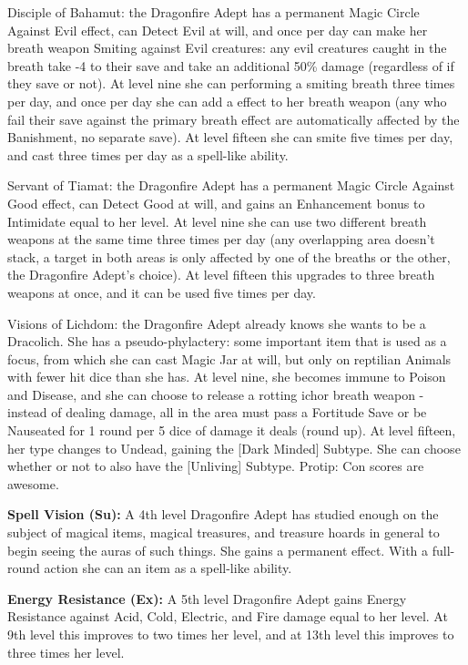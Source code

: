 \begin{description*}
\item[Disciple of Bahamut:] the Dragonfire Adept has a permanent Magic Circle Against Evil effect, can Detect Evil at will, and once per day can make her breath weapon Smiting against Evil creatures: any evil creatures caught in the breath take -4 to their save and take an additional 50\% damage (regardless of if they save or not). At level nine she can performing a smiting breath three times per day, and once per day she can add a  effect to her breath weapon (any who fail their save against the primary breath effect are automatically affected by the Banishment, no separate save). At level fifteen she can smite five times per day, and cast  three times per day as a spell-like ability.
\item[Servant of Tiamat:] the Dragonfire Adept has a permanent Magic Circle Against Good effect, can Detect Good at will, and gains an Enhancement bonus to Intimidate equal to her level. At level nine she can use two different breath weapons at the same time three times per day (any overlapping area doesn't stack, a target in both areas is only affected by one of the breaths or the other, the Dragonfire Adept's choice). At level fifteen this upgrades to three breath weapons at once, and it can be used five times per day.
\item[Visions of Lichdom:] the Dragonfire Adept already knows she wants to be a Dracolich. She has a pseudo-phylactery: some important item that is used as a focus, from which she can cast Magic Jar at will, but only on reptilian Animals with fewer hit dice than she has. At level nine, she becomes immune to Poison and Disease, and she can choose to release a rotting ichor breath weapon - instead of dealing damage, all in the area must pass a Fortitude Save or be Nauseated for 1 round per 5 dice of damage it deals (round up). At level fifteen, her type changes to Undead, gaining the [Dark Minded] Subtype. She can choose whether or not to also have the [Unliving] Subtype. Protip: Con scores are awesome.
\end{description*}

\textbf{Spell Vision (Su):} A 4th level Dragonfire Adept has studied enough on the subject of magical items, magical treasures, and treasure hoards in general to begin seeing the auras of such things. She gains a permanent  effect. With a full-round action she can  an item as a spell-like ability.

\textbf{Energy Resistance (Ex):} A 5th level Dragonfire Adept gains Energy Resistance against Acid, Cold, Electric, and Fire damage equal to her level. At 9th level this improves to two times her level, and at 13th level this improves to three times her level.


